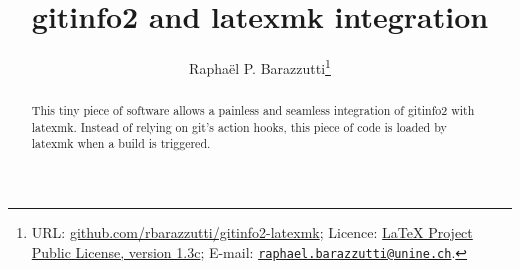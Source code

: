 \documentclass[A4]{ltxdoc}
\begin{document}
\thispagestyle{plain}
\title{gitinfo2 and latexmk integration}

\author{%
  Raphaël P. Barazzutti\thanks{%
    URL: \href{https://github.com/rbarazzutti/gitinfo2-latexmk}{github.com/rbarazzutti/gitinfo2-latexmk};
    Licence: \href{http://latex-project.org/lppl/lppl-1-3c.txt}{LaTeX Project Public License, version 1.3c};
    E-mail: \href{mailto:raphael.barazzutti@unine.ch}{\tt raphael.barazzutti@unine.ch}.}}

\maketitle
\thispagestyle{plain}
\begin{abstract}
    This tiny piece of software allows a painless and seamless integration of \textsf{gitinfo2} with \textsf{latexmk}. Instead of relying on \textsf{git}'s action hooks, this piece of code is loaded
    by \textsf{latexmk} when a build is triggered.
\end{abstract}

\end{document}
